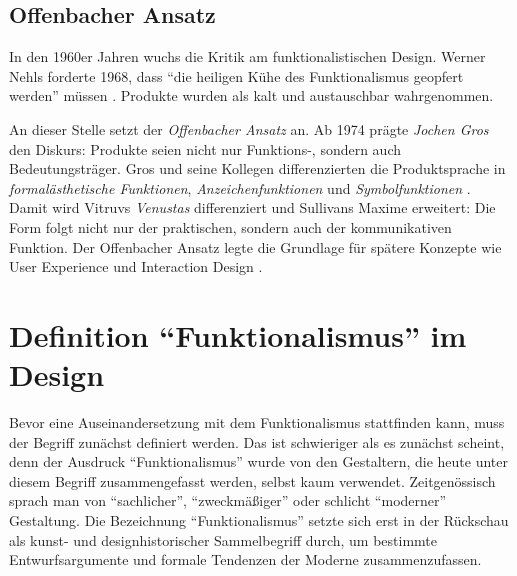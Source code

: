 \documentclass[
    a4paper,
    11pt,
    bibliography=totoc,
    listof=totoc,
    parskip=half,
    headings=normal
]{scrbook}
\begin{document}
\section{Offenbacher Ansatz}
In den 1960er Jahren wuchs die Kritik am funktionalistischen Design. Werner Nehls forderte 1968, dass \enquote{die heiligen Kühe des Funktionalismus geopfert werden} müssen \autocite[24]{schwerOffenbacherAnsatzEinleitung2021}. Produkte wurden als kalt und austauschbar wahrgenommen.

An dieser Stelle setzt der \textit{Offenbacher Ansatz} an. Ab 1974 prägte \textit{Jochen Gros} den Diskurs: Produkte seien nicht nur Funktions-, sondern auch Bedeutungsträger. Gros und seine Kollegen differenzierten die Produktsprache in \textit{formalästhetische Funktionen}, \textit{Anzeichenfunktionen} und \textit{Symbolfunktionen} \autocite[121]{grosGrundlagenEinerTheorie2021}. Damit wird Vitruvs \textit{Venustas} differenziert und Sullivans Maxime erweitert: Die Form folgt nicht nur der praktischen, sondern auch der kommunikativen Funktion. Der Offenbacher Ansatz legte die Grundlage für spätere Konzepte wie User Experience und Interaction Design \autocite[12\psqq]{steffenDesignAlsProduktsprache2000}.

\chapter{Definition \enquote{Funktionalismus} im Design}

Bevor eine Auseinandersetzung mit dem Funktionalismus stattfinden kann, muss der Begriff zunächst definiert werden. Das ist schwieriger als es zunächst scheint, denn der Ausdruck \enquote{Funktionalismus} wurde von den Gestaltern, die heute unter diesem Begriff zusammengefasst werden, selbst kaum verwendet. Zeitgenössisch sprach man von \enquote{sachlicher}, \enquote{zweckmäßiger} oder schlicht \enquote{moderner} Gestaltung. Die Bezeichnung \enquote{Funktionalismus} setzte sich erst in der Rückschau als kunst- und designhistorischer Sammelbegriff durch, um bestimmte Entwurfsargumente und formale Tendenzen der Moderne zusammenzufassen.
\end{document}
